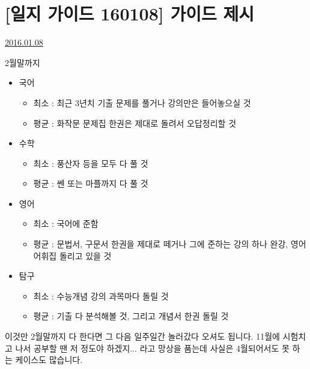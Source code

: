 

\section{[일지 가이드 160108] 가이드 제시}
\href{https://www.kockoc.com/Apoc/580103}{2016.01.08}

\vspace{5mm}

2월말까지
\vspace{5mm}
\begin{itemize}

\item 국어
    \begin{itemize}
        \item 최소 : 최근 3년치 기출 문제를 풀거나 강의만은 들어놓으실 것
        \item 평균 : 화작문 문제집 한권은 제대로 돌려서 오답정리할 것
    \end{itemize}
\vspace{5mm}

    \item 수학
    \begin{itemize}
        \item 최소 : 풍산자 등을 모두 다 풀 것
        \item 평균 : 쎈 또는 마플까지 다 풀 것
    \end{itemize}
    \vspace{5mm}

    \item 영어
    \begin{itemize}
        \item 최소 : 국어에 준함
        \item 평균 : 문법서, 구문서 한권을 제대로 떼거나 그에 준하는 강의 하나 완강, 영어어휘집 돌리고 있을 것
    \end{itemize}
    
    \vspace{5mm}

    \item 탐구
    \begin{itemize}
        \item 최소 : 수능개념 강의 과목마다 돌릴 것
        \item 평균 : 기출 다 분석해볼 것, 그리고 개념서 한권 돌릴 것
    \end{itemize}
\vspace{5mm}
\end{itemize}
이것만 2월말까지 다 한다면 그 다음 일주일간 놀러갔다 오셔도 됩니다.
11월에 시험치고 나서 공부할 땐 저 정도야 하겠지... 라고 망상을 품는데
사실은 4월되어서도 못 하는 케이스도 많습니다.
\vspace{5mm}

